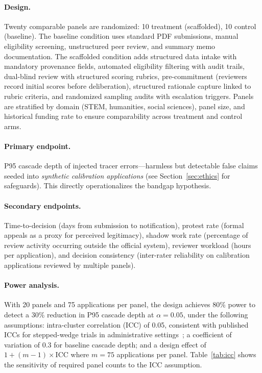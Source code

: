 \documentclass[runningheads]{llncs}
\begin{document}
\paragraph{Design.}
Twenty comparable panels are randomized: 10 treatment (scaffolded), 10 control (baseline). The baseline condition uses standard PDF submissions, manual eligibility screening, unstructured peer review, and summary memo documentation. The scaffolded condition adds structured data intake with mandatory provenance fields, automated eligibility filtering with audit trails, dual-blind review with structured scoring rubrics, pre-commitment (reviewers record initial scores before deliberation), structured rationale capture linked to rubric criteria, and randomized sampling audits with escalation triggers. Panels are stratified by domain (STEM, humanities, social sciences), panel size, and historical funding rate to ensure comparability across treatment and control arms.

\paragraph{Primary endpoint.}
P95 cascade depth of injected tracer errors---harmless but detectable false claims seeded into \emph{synthetic calibration applications} (see Section~\ref{sec:ethics} for safeguards). This directly operationalizes the bandgap hypothesis.

\paragraph{Secondary endpoints.}
Time-to-decision (days from submission to notification), protest rate (formal appeals as a proxy for perceived legitimacy), shadow work rate (percentage of review activity occurring outside the official system), reviewer workload (hours per application), and decision consistency (inter-rater reliability on calibration applications reviewed by multiple panels).

\paragraph{Power analysis.}
With 20 panels and 75 applications per panel, the design achieves 80\% power to detect a 30\% reduction in P95 cascade depth at $\alpha = 0.05$, under the following assumptions: intra-cluster correlation (ICC) of 0.05, consistent with published ICCs for stepped-wedge trials in administrative settings~\cite{hemming2015stepped}; a coefficient of variation of 0.3 for baseline cascade depth; and a design effect of $1 + (m-1) \times \mathrm{ICC}$ where $m = 75$ applications per panel. Table~\ref{tab:icc} shows the sensitivity of required panel counts to the ICC assumption.
\end{document}
